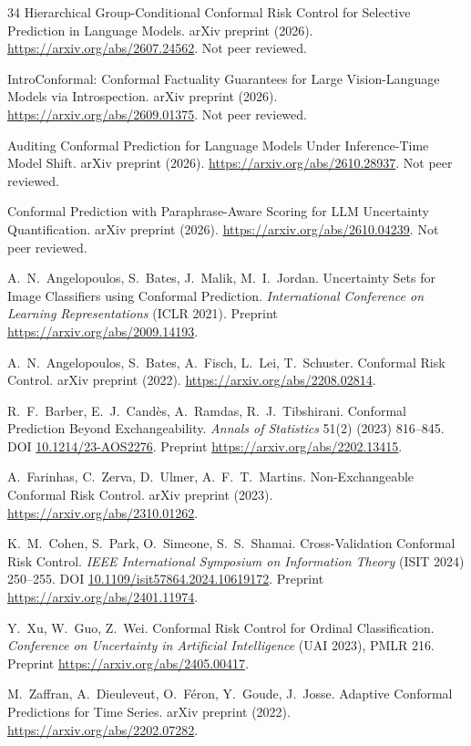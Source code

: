 \documentclass[a4paper,longmktitle]{cas-sc}
\begin{document}
\begin{thebibliography}{34}
 Hierarchical Group-Conditional Conformal Risk Control for Selective Prediction in Language Models. arXiv preprint (2026). \url{https://arxiv.org/abs/2607.24562}. Not peer reviewed.

 IntroConformal: Conformal Factuality Guarantees for Large Vision-Language Models via Introspection. arXiv preprint (2026). \url{https://arxiv.org/abs/2609.01375}. Not peer reviewed.

 Auditing Conformal Prediction for Language Models Under Inference-Time Model Shift. arXiv preprint (2026). \url{https://arxiv.org/abs/2610.28937}. Not peer reviewed.

 Conformal Prediction with Paraphrase-Aware Scoring for LLM Uncertainty Quantification. arXiv preprint (2026). \url{https://arxiv.org/abs/2610.04239}. Not peer reviewed.

 A.~N.~Angelopoulos, S.~Bates, J.~Malik, M.~I.~Jordan. Uncertainty Sets for Image Classifiers using Conformal Prediction. \emph{International Conference on Learning Representations} (ICLR 2021). Preprint \url{https://arxiv.org/abs/2009.14193}.

 A.~N.~Angelopoulos, S.~Bates, A.~Fisch, L.~Lei, T.~Schuster. Conformal Risk Control. arXiv preprint (2022). \url{https://arxiv.org/abs/2208.02814}.

 R.~F.~Barber, E.~J.~Cand\`es, A.~Ramdas, R.~J.~Tibshirani. Conformal Prediction Beyond Exchangeability. \emph{Annals of Statistics} 51(2) (2023) 816--845. DOI \url{10.1214/23-AOS2276}. Preprint \url{https://arxiv.org/abs/2202.13415}.

 A.~Farinhas, C.~Zerva, D.~Ulmer, A.~F.~T.~Martins. Non-Exchangeable Conformal Risk Control. arXiv preprint (2023). \url{https://arxiv.org/abs/2310.01262}.

 K.~M.~Cohen, S.~Park, O.~Simeone, S.~S.~Shamai. Cross-Validation Conformal Risk Control. \emph{IEEE International Symposium on Information Theory} (ISIT 2024) 250--255. DOI \url{10.1109/isit57864.2024.10619172}. Preprint \url{https://arxiv.org/abs/2401.11974}.

 Y.~Xu, W.~Guo, Z.~Wei. Conformal Risk Control for Ordinal Classification. \emph{Conference on Uncertainty in Artificial Intelligence} (UAI 2023), PMLR 216. Preprint \url{https://arxiv.org/abs/2405.00417}.

 M.~Zaffran, A.~Dieuleveut, O.~F\'eron, Y.~Goude, J.~Josse. Adaptive Conformal Predictions for Time Series. arXiv preprint (2022). \url{https://arxiv.org/abs/2202.07282}.


\end{thebibliography}
\end{document}
